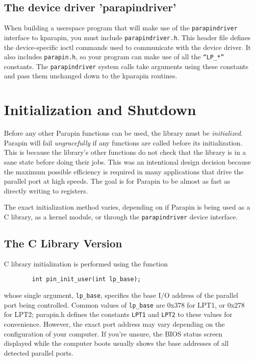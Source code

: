 \documentclass{article}
\begin{document}
\subsection{The device driver 'parapindriver'}

When building a userspace program that will make use of the {\tt parapindriver}
interface to kparapin, you must include {\tt parapindriver.h}.  This header
file defines the device-specific ioctl commands used to communicate
with the device driver.  It also includes {\tt parapin.h}, so your program
can make use of all the {\tt ``LP\_*''} constants.  The {\tt parapindriver}
system calls take arguments using these constants and pass them unchanged
down to the kparapin routines.


\section{Initialization and Shutdown}
\label{initialization}

Before any other Parapin functions can be used, the library must be
{\em initialized}.  Parapin will fail {\em ungracefully} if any
functions are called before its initialization.  This is because the
library's other functions do not check that the library is in
a sane state before doing their jobs.  This was an intentional design
decision because the maximum possible efficiency is required in many
applications that drive the parallel port at high speeds.  The goal is
for Parapin to be almost as fast as directly writing to registers.

The exact initialization method varies, depending on if Parapin
is being used as a C library, as a kernel module, or through the
{\tt parapindriver} device interface.

\subsection{The C Library Version}

C library initialization is performed using the function
\begin{verbatim}
        int pin_init_user(int lp_base);
\end{verbatim}
whose single argument, {\tt lp\_base}, specifies the base I/O address
of the parallel port being controlled.  Common values of {\tt lp\_base}
are 0x378 for LPT1, or 0x278 for LPT2; parapin.h defines the constants
{\tt LPT1} and {\tt LPT2} to these values for convenience.  However,
the exact port address may vary depending on the configuration of your
computer.  If you're unsure, the BIOS status screen displayed while
the computer boots usually shows the base addresses of all detected
parallel ports.
\end{document}

